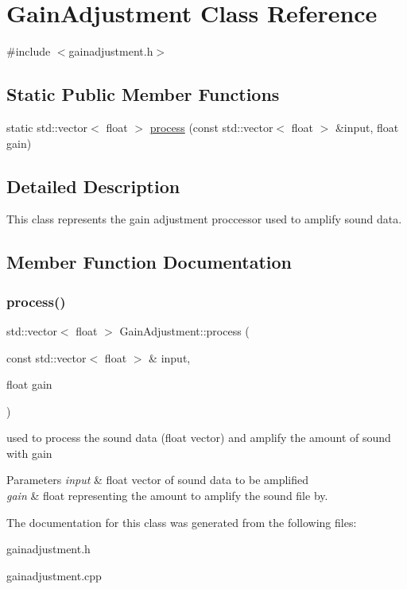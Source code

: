\hypertarget{classGainAdjustment}{}\section{Gain\+Adjustment Class Reference}
\label{classGainAdjustment}


{\ttfamily \#include $<$gainadjustment.\+h$>$}

\subsection*{Static Public Member Functions}
\begin{DoxyCompactItemize}
\item 
static std\+::vector$<$ float $>$ \hyperlink{classGainAdjustment_a2cc0f1e4ab26365d775f10d6e3e589ef}{process} (const std\+::vector$<$ float $>$ \&input, float gain)
\end{DoxyCompactItemize}


\subsection{Detailed Description}
This class represents the gain adjustment proccessor used to amplify sound data. 

\subsection{Member Function Documentation}
\mbox{\label{classGainAdjustment_a2cc0f1e4ab26365d775f10d6e3e589ef}} 
\subsubsection{\texorpdfstring{process()}{process()}}
{\footnotesize\ttfamily std\+::vector$<$ float $>$ Gain\+Adjustment\+::process (\begin{DoxyParamCaption}\item[{const std\+::vector$<$ float $>$ \&}]{input,  }\item[{float}]{gain }\end{DoxyParamCaption})\hspace{0.3cm}{\ttfamily [static]}}

used to process the sound data (float vector) and amplify the amount of sound with gain 
\begin{DoxyParams}{Parameters}
{\em input} & float vector of sound data to be amplified \\
\hline
{\em gain} & float representing the amount to amplify the sound file by. \\
\hline
\end{DoxyParams}


The documentation for this class was generated from the following files\+:\begin{DoxyCompactItemize}
\item 
gainadjustment.\+h\item 
gainadjustment.\+cpp\end{DoxyCompactItemize}
